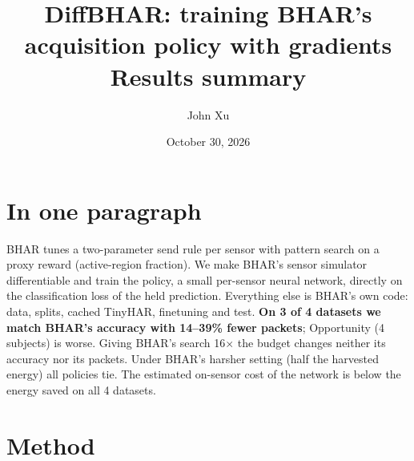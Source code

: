 \documentclass[10pt]{article}
\title{DiffBHAR: training BHAR's acquisition policy with gradients\\[2pt]\large Results summary}
\author{John Xu}
\date{October 30, 2026}
\begin{document}
\maketitle

\section*{In one paragraph}
BHAR tunes a two-parameter send rule per sensor with pattern search on a proxy reward (active-region fraction). We make BHAR's sensor simulator differentiable and train the policy, a small per-sensor neural network, directly on the classification loss of the held prediction. Everything else is BHAR's own code: data, splits, cached TinyHAR, finetuning and test. \textbf{On 3 of 4 datasets we match BHAR's accuracy with 14--39\% fewer packets}; Opportunity (4 subjects) is worse. Giving BHAR's search 16$\times$ the budget changes neither its accuracy nor its packets. Under BHAR's harsher setting (half the harvested energy) all policies tie. The estimated on-sensor cost of the network is below the energy saved on all 4 datasets.

\section{Method}
\end{document}
